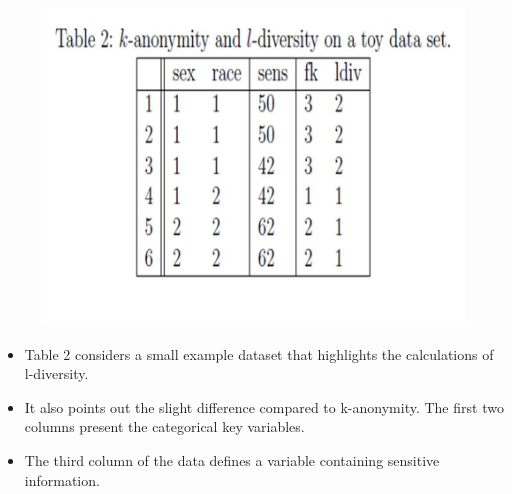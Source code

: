 \documentclass{beamer}
\begin{document}
	\begin{frame}
	\begin{figure}
\centering
\includegraphics[width=0.7\linewidth]{TemplJPGs2/Table2}
\caption{}
\label{fig:Table2}
\end{figure}

	\end{frame}
	\begin{frame}
	\begin{itemize}
 \item		Table 2 considers a small example dataset that highlights the calculations of
		l-diversity.
		\item  It also points out the slight difference compared to k-anonymity. The
		ﬁrst two columns present the categorical key variables. 
		\item The third column of the
		data deﬁnes a variable containing sensitive information. 
		\end{itemize}
		\end{frame}
\end{document}
